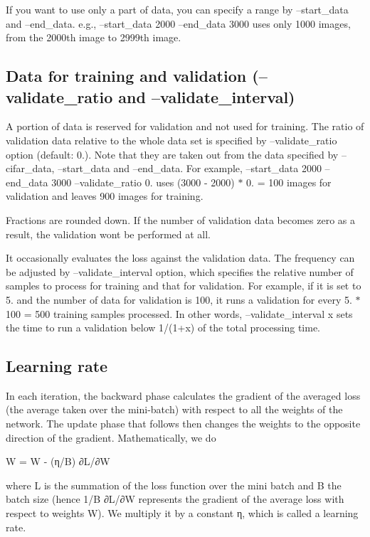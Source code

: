 If you want to use only a part of data, you can specify a range by --start\+\_\+data and --end\+\_\+data. e.\+g., --start\+\_\+data 2000 --end\+\_\+data 3000 uses only 1000 images, from the 2000th image to 2999th image.

\subsection*{Data for training and validation (--validate\+\_\+ratio and --validate\+\_\+interval) }

A portion of data is reserved for validation and not used for training. The ratio of validation data relative to the whole data set is specified by --validate\+\_\+ratio option (default\+: 0.). Note that they are taken out from the data specified by --cifar\+\_\+data, --start\+\_\+data and --end\+\_\+data. For example, --start\+\_\+data 2000 --end\+\_\+data 3000 --validate\+\_\+ratio 0. uses (3000 -\/ 2000) $\ast$ 0. = 100 images for validation and leaves 900 images for training.

Fractions are rounded down. If the number of validation data becomes zero as a result, the validation won\textquotesingle{}t be performed at all.

It occasionally evaluates the loss against the validation data. The frequency can be adjusted by --validate\+\_\+interval option, which specifies the relative number of samples to process for training and that for validation. For example, if it is set to 5. and the number of data for validation is 100, it runs a validation for every 5. $\ast$ 100 = 500 training samples processed. In other words, --validate\+\_\+interval x sets the time to run a validation below 1/(1+x) of the total processing time.

\subsection*{Learning rate }

In each iteration, the backward phase calculates the gradient of the averaged loss (the average taken over the mini-\/batch) with respect to all the weights of the network. The update phase that follows then changes the weights to the opposite direction of the gradient. Mathematically, we do \begin{DoxyVerb}W = W - (η/B) ∂L/∂W
\end{DoxyVerb}


where L is the summation of the loss function over the mini batch and B the batch size (hence 1/B ∂\+L/∂W represents the gradient of the average loss with respect to weights W). We multiply it by a constant η, which is called a learning rate.

